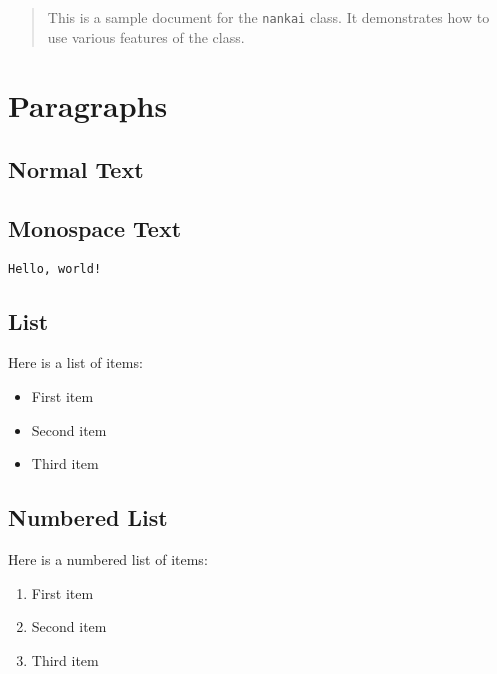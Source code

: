 \maketitle

\begin{abstract}
    This is a sample document for the \texttt{nankai} class.
    It demonstrates how to use various features of the class.
\end{abstract}

\tableofcontents

\clearpage

\section{Paragraphs}

\subsection{Normal Text}

\lipsum[1-20]

\subsection{Monospace Text}

\texttt{Hello, world!}

\subsection{List}

Here is a list of items:

\begin{itemize}
    \item First item
    \item Second item
    \item Third item
\end{itemize}

\subsection{Numbered List}

Here is a numbered list of items:

\begin{enumerate}
    \item First item
    \item Second item
    \item Third item
\end{enumerate}

